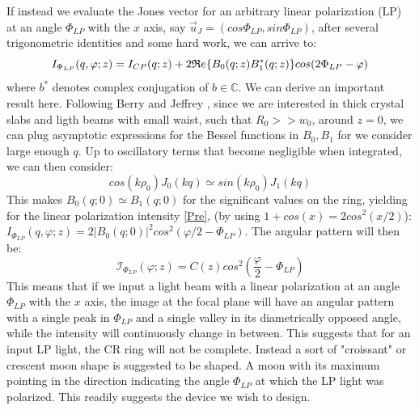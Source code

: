 \documentclass[11pt, a4paper, twoside]{article} %
\newcommand{\C}{\mathbb{C}}
\begin{document}
If instead we evaluate the Jones vector for an arbitrary linear polarization (LP) at an angle $\Phi_{LP}$ with the $x$ axis, say $\vec{u}_J=(cos\Phi_{LP}, sin\Phi_{LP})$, after several trigonometric identities and some hard work, we can arrive to:\vspace{-0.1cm}
\begin{equation}\label{Pre}
I_{\Phi_{LP}}(q,\varphi;z)=I_{CP}(q;z)+2\mathfrak{R}e\qty{B_0(q;z)B_1^*(q;z)}cos(2\Phi_{LP}-\varphi)
\end{equation}
where $b^*$ denotes complex conjugation of $b\in\C$. We can derive an important result here. Following Berry and Jeffrey \cite{Berry, BerryJeffrey, Jeffrey}, since we are interested in thick crystal slabs and ligth beams with small waist, such that $R_0>>w_0$, around $z=0$, we can plug asymptotic expressions for the Bessel functions in $B_0,B_1$ for we consider large enough $q$. Up to oscillatory terms that become negligible when integrated, we can then consider:\vspace{-0.1cm}
\begin{equation}
cos(k\rho_0)J_0(kq)\simeq sin(k\rho_0)J_1(kq)
\end{equation}
This makes $B_0(q;0)\simeq B_1(q;0)$ for the significant values on the ring, yielding for the linear polarization intensity \eqref{Pre}, (by using $1+cos(x)=2cos^2(x/2)$): $I_{\Phi_{LP}}(q,\varphi;z)=2|B_0(q;0)|^2cos^2(\varphi/2-\Phi_{LP})$. The angular pattern will then be:
\begin{equation}\label{cosine}
\mathcal{I}_{\Phi_{LP}}(\varphi;z)=C(z)cos^2(\frac{\varphi}{2}-\Phi_{LP})
\end{equation}
This means that if we input a light beam with a linear polarization at an angle $\Phi_{LP}$ with the $x$ axis, the image at the focal plane will have an angular pattern with a single peak in $\Phi_{LP}$ and a single valley in its diametrically opposed angle, while the intensity will continuously change in between. This suggests that for an input LP light, the CR ring will not be complete. Instead a sort of "croissant" or crescent moon shape is suggested to be shaped. A moon with its maximum pointing in the direction indicating the angle $\Phi_{LP}$ at which the LP light was polarized. This readily suggests the device we wish to design.
\vspace{-0.1cm}
\end{document}
